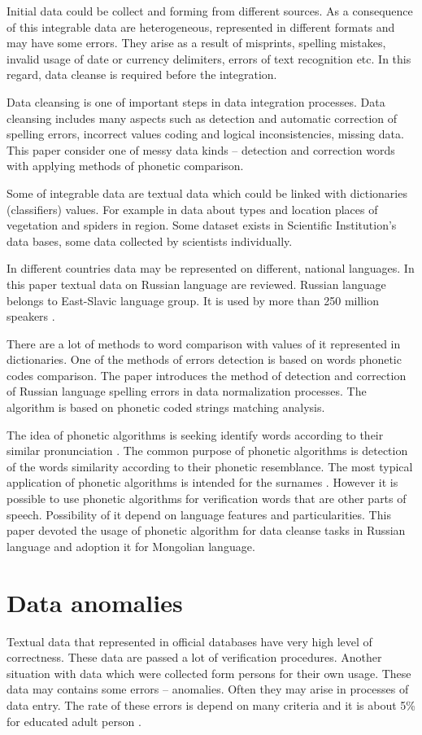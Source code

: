\documentclass[conference,a4paper]{IEEEtran}
\begin{document}
Initial data could be collect and forming from different sources. As a consequence of this integrable data are heterogeneous, represented in different formats and may have some errors. They arise as a result of misprints, spelling mistakes, invalid usage of date or currency delimiters, errors of text recognition etc. In this regard, data cleanse is required before the integration.

Data cleansing is one of important steps in data integration processes. Data cleansing includes many aspects such as detection and automatic correction of spelling errors, incorrect values coding and logical inconsistencies, missing data. This paper consider one of messy data kinds -- detection and correction words with applying methods of phonetic comparison. 

Some of integrable data are textual data which could be linked with dictionaries (classifiers) values. For example in data about types and location places of vegetation and spiders in region. Some dataset exists in Scientific Institution's data bases, some data collected by scientists individually.

In different countries data may be represented on different, national languages. In this paper textual data on Russian language are reviewed. Russian language belongs to East-Slavic language group. It is used by more than 250 million speakers \cite{Cubberley-2002}.

There are a lot of methods to word comparison with values of it represented in dictionaries. One of the methods of errors detection is based on words phonetic codes comparison. The paper introduces the method of detection and correction of Russian language spelling errors in data normalization processes. The algorithm is based on phonetic coded strings matching analysis.
 
The idea of phonetic algorithms is seeking identify words according to their similar pronunciation \cite{Parmar-2014}. The common purpose of phonetic algorithms is detection of the words similarity according to their phonetic resemblance. The most typical application of phonetic algorithms is intended for the surnames \cite{Zahoransky-2015}. However it is possible to use phonetic algorithms for verification words that are other parts of speech. Possibility of it depend on language features and particularities. This paper devoted the usage of phonetic algorithm for data cleanse tasks in Russian language and adoption it for Mongolian language.

\section{Data anomalies}
Textual data that represented in official databases have very high level of correctness. These data are passed a lot of verification procedures. Another situation with data which were collected form persons for their own usage. These data may contains some errors – anomalies. Often they may arise in processes of data entry. The rate of these errors is depend on many criteria and it is about 5\% for educated adult person \cite{Orr-1998}. 
\end{document}
